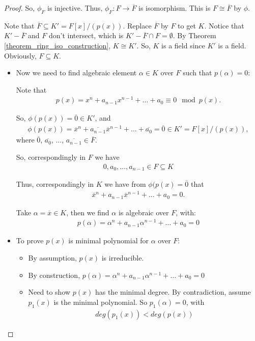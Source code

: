 \documentclass[utf8]{ctexbook}
\theoremstyle{definition}
\begin{document}
\begin{proof}
So, $\phi_{F}$ is injective. Thus, $\phi_{F} : F \longrightarrow \overline{F}$ is isomorphism. This is $F \cong \overline{F}$ by $\phi$.

Note that $\overline{F} \subseteq K' = F[x] / (p(x)) $. Replace $\overline{F}$ by $F$ to get $K$. Notice that $K' - \overline{F} $ and $ F$ don't intersect, which is $ K' - \overline{F} \cap F = \emptyset $. By Theorem \ref{theorem_ring_iso_construction}, $K \cong K'$. So, $K$ is a field since $K'$ is a field. Obviously, $F \subseteq K$.


\begin{itemize}
\item{Now we need to find algebraic element $\alpha \in  K $ over $F$ such that $p(\alpha) = 0$: 

Note that 
\begin{align*}
p(x) = x^n + a_{n-1} x^{n-1} + \ldots + a_0 \equiv 0 \mod p(x) .
\end{align*}

So, $\phi(p(x)) = \overline{0} \in K' $, and
\begin{align*}
\phi(p(x)) = \overline{x}^n + \overline{a_{n-1}} \overline{x}^{n-1} + \ldots + \overline{a_0} = \overline{0} \in K' = F[x]/(p(x)),
\end{align*}
where $\overline{0}$, $\overline{a_0}$, $\ldots$, $\overline{a_{n-1}} \in \overline{F}$.

So, correspondingly in $F$ we have
\begin{align*}
0, a_0, \ldots, a_{n-1} \in F \subseteq K
\end{align*}

Thus, correspondingly in $K$ we have from $\phi(p(x) = \overline{0}$ that
\begin{align*}
\overline{x}^n + a_{n-1} \overline{x}^{n-1} + \ldots + a_0 = 0 .
\end{align*}

Take $\alpha = \overline{x} \in K$, then we find $\alpha$ is algebraic over $F$, with:
\begin{align*}
p(\alpha) = \alpha^n + a_{n-1} \alpha^{n-1} + \ldots + a_0 = 0
\end{align*}
}
\item{To prove $p(x)$ is minimal polynomial for $\alpha$ over $F$:
\begin{itemize}
\item{By assumption, $p(x)$ is irreducible.}
\item{By construction, $p(\alpha) = \alpha^n + a_{n-1} \alpha^{n-1} + \ldots + a_0 = 0$ }
\item{Need to show $p(x)$ has the minimal degree. By contradiction, assume $p_1 (x)$ is the minimal polynomial. So $p_1 (\alpha) = 0$, with
\begin{align*}
deg(p_1 (x)) < deg(p(x))
\end{align*}

}
\end{itemize}}
\end{itemize}
\end{proof}
\end{document}
